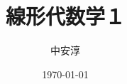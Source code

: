\documentclass{jsbook}
\theoremstyle{definition}
\theoremstyle{remark}
\numberwithin{equation}{section}
\begin{document}
\title{線形代数学１}
\author{中安淳}
\date{\today}

\maketitle

% 

\tableofcontents














\end{document}
